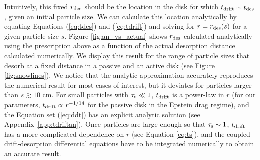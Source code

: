 \documentclass[apj]{emulateapj}
\newcommand{\App}[1]{Appendix~\ref{#1}}
\begin{document}
Intuitively, this fixed $r_{\rm des}$ should be the location in the disk for which $t_{\rm drift} \sim t_{\rm des}$, given an initial particle size. We can calculate this location analytically by equating Equations (\ref{eq:tdes}) and (\ref{eq:tdrift}) and solving for $r=r_{\rm des}(s)$ for a given particle size $s$. Figure \ref{fig:an_vs_actual} shows $r_{\rm des}$ calculated analytically using the prescription above as a function of the actual desorption distance calculated numerically. We display this result for the range of particle sizes that desorb at a fixed distance in a passive and an active disk (see Figure \ref{fig:snowlines}). We notice that the analytic approximation accurately reproduces the numerical result for most cases of interest, but it deviates for particles larger than $s \gtrsim10$ cm. For small particles with $\tau_{\rm s} \ll 1$, $t_{\rm drift}$ is a power-law in $r$ (for our parameters, $t_{\rm drift} \propto r^{-1/14}$ for the passive disk in the Epstein drag regime), and the Equation set (\ref{eq:ddt}) has an explicit analytic solution (see \App{app:tdriftan}). Once particles are large enough so that $\tau_{\rm s} \sim 1$, $t_{\rm drift}$ has a more complicated dependence on $r$ (see Equation \ref{eq:ts}), and the coupled drift-desorption differential equations have to be integrated numerically to obtain an accurate result. 


\end{document}
